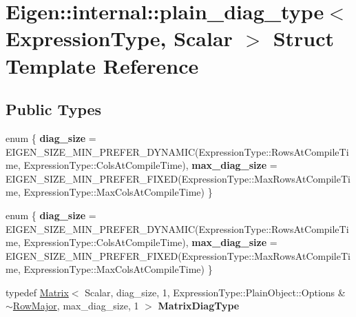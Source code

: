 \hypertarget{struct_eigen_1_1internal_1_1plain__diag__type}{}\section{Eigen\+:\+:internal\+:\+:plain\+\_\+diag\+\_\+type$<$ Expression\+Type, Scalar $>$ Struct Template Reference}
\label{struct_eigen_1_1internal_1_1plain__diag__type}
\subsection*{Public Types}
\begin{DoxyCompactItemize}
\item 
\mbox{\label{struct_eigen_1_1internal_1_1plain__diag__type_aa202edc04f3d2dfef523eaced33c3c02}} 
enum \{ {\bfseries diag\+\_\+size} = E\+I\+G\+E\+N\+\_\+\+S\+I\+Z\+E\+\_\+\+M\+I\+N\+\_\+\+P\+R\+E\+F\+E\+R\+\_\+\+D\+Y\+N\+A\+M\+IC(Expression\+Type\+:\+:Rows\+At\+Compile\+Time, Expression\+Type\+:\+:Cols\+At\+Compile\+Time), 
{\bfseries max\+\_\+diag\+\_\+size} = E\+I\+G\+E\+N\+\_\+\+S\+I\+Z\+E\+\_\+\+M\+I\+N\+\_\+\+P\+R\+E\+F\+E\+R\+\_\+\+F\+I\+X\+ED(Expression\+Type\+:\+:Max\+Rows\+At\+Compile\+Time, Expression\+Type\+:\+:Max\+Cols\+At\+Compile\+Time)
 \}
\item 
\mbox{\label{struct_eigen_1_1internal_1_1plain__diag__type_a03fc48caa0512545acb691d14520016c}} 
enum \{ {\bfseries diag\+\_\+size} = E\+I\+G\+E\+N\+\_\+\+S\+I\+Z\+E\+\_\+\+M\+I\+N\+\_\+\+P\+R\+E\+F\+E\+R\+\_\+\+D\+Y\+N\+A\+M\+IC(Expression\+Type\+:\+:Rows\+At\+Compile\+Time, Expression\+Type\+:\+:Cols\+At\+Compile\+Time), 
{\bfseries max\+\_\+diag\+\_\+size} = E\+I\+G\+E\+N\+\_\+\+S\+I\+Z\+E\+\_\+\+M\+I\+N\+\_\+\+P\+R\+E\+F\+E\+R\+\_\+\+F\+I\+X\+ED(Expression\+Type\+:\+:Max\+Rows\+At\+Compile\+Time, Expression\+Type\+:\+:Max\+Cols\+At\+Compile\+Time)
 \}
\item 
\mbox{\label{struct_eigen_1_1internal_1_1plain__diag__type_a69632fbb83643a8b45c7d08d4b2d7c77}} 
typedef \hyperlink{group___core___module_class_eigen_1_1_matrix}{Matrix}$<$ Scalar, diag\+\_\+size, 1, Expression\+Type\+::\+Plain\+Object\+::\+Options \&$\sim$\hyperlink{group__enums_ggaacded1a18ae58b0f554751f6cdf9eb13acfcde9cd8677c5f7caf6bd603666aae3}{Row\+Major}, max\+\_\+diag\+\_\+size, 1 $>$ {\bfseries Matrix\+Diag\+Type}

\end{DoxyCompactItemize}
